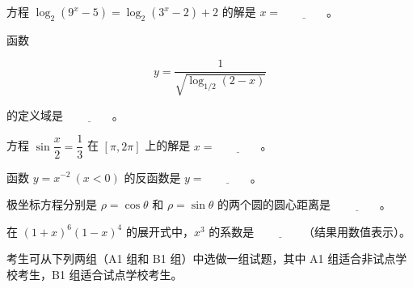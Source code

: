 \begin{question}
方程 $\log_2(9^x-5)=\log_2(3^x-2)+2$ 的解是 $x=\underline{\qquad\qquad}$。

\end{question}
\begin{question}
函数

\nopagebreak[4]
\[
y=\dfrac{1}{\sqrt{\log_{1/2}(2-x)}}
\]

的定义域是 $\underline{\qquad\qquad}$。

\end{question}
\begin{question}
方程 $\sin\dfrac{x}{2}=\dfrac13$ 在 $[\pi,2\pi]$ 上的解是 $x=\underline{\qquad\qquad}$。

\end{question}
\begin{question}
函数 $y=x^{-2}\ (x<0)$ 的反函数是 $y=\underline{\qquad\qquad}$。

\end{question}
\begin{question}
极坐标方程分别是 $\rho=\cos\theta$ 和 $\rho=\sin\theta$ 的两个圆的圆心距离是 $\underline{\qquad\qquad}$。

\end{question}
\begin{question}
在 $(1+x)^6(1-x)^4$ 的展开式中，$x^3$ 的系数是 $\underline{\qquad\qquad}$（结果用数值表示）。

\end{question}

考生可从下列两组（A1 组和 B1 组）中选做一组试题，其中 A1 组适合非试点学校考生，B1 组适合试点学校考生。

